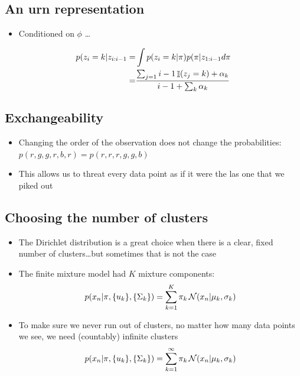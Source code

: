 \documentclass[b5paper]{report}
\begin{document}
\subsection{An urn representation}

\begin{itemize}
  \item Conditioned on $\phi$ \dots
\end{itemize}

\begin{align}
  p(z_i = k| z_{i:i-1} =& \int p(z_i = k| \pi) p(\pi|z_{1:i-1} d\pi \\
      =& \frac{\sum_{j=1}{i-1} \operatorname*{\mathbb{\mathop{I}}}(z_j = k) + \alpha_k}{i - 1 + \sum_k
      \alpha_k}
\end{align}

\subsection{Exchangeability}

\begin{itemize}
  \item Changing the order of the observation does not change the probabilities:
    $p(r,g,g,r,b,r) = p(r,r,r,g,g,b)$
  \item This allows us to threat every data point as if it were the las one
    that we piked out
\end{itemize}

\subsection{Choosing the number of clusters}

\begin{itemize}
  \item The Dirichlet distribution is a great choice when there is a clear,
    fixed number of clusters\dots but sometimes that is not the case
  \item The finite mixture model had $K$ mixture components:
    \begin{equation}
      p(x_n|\pi, \{u_k\}, \{\Sigma_k\}) = \sum_{k=1}^K \pi_k \operatorname*{\mathcal{N}}(x_n|\mu_k,
      \sigma_k)
    \end{equation}
  \item To make sure we never run out of clusters, no matter how many data
    points we see, we need (countably) infinite clusters
    \begin{equation}
      p(x_n|\pi, \{u_k\}, \{\Sigma_k\}) = \sum_{k=1}^\infty \pi_k \operatorname*{\mathcal{N}}(x_n|\mu_k,
      \sigma_k)
    \end{equation}
\end{itemize}
\end{document}
